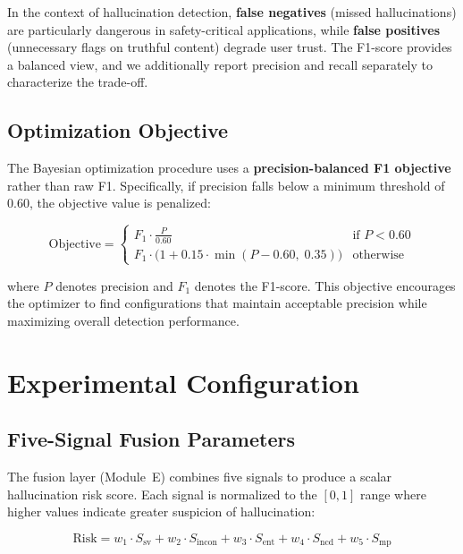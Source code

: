 In the context of hallucination detection, \textbf{false negatives} (missed hallucinations) are particularly dangerous in safety-critical applications, while \textbf{false positives} (unnecessary flags on truthful content) degrade user trust. The F1-score provides a balanced view, and we additionally report precision and recall separately to characterize the trade-off.

\subsection{Optimization Objective}
\label{sec:opt-objective}

The Bayesian optimization procedure uses a \textbf{precision-balanced F1 objective} rather than raw F1. Specifically, if precision falls below a minimum threshold of 0.60, the objective value is penalized:

\begin{equation}
    \text{Objective} =
    \begin{cases}
        F_1 \cdot \frac{P}{0.60}          & \text{if } P < 0.60 \\[6pt]
        F_1 \cdot \bigl(1 + 0.15 \cdot \min(P - 0.60,\; 0.35)\bigr) & \text{otherwise}
    \end{cases}
    \label{eq:objective}
\end{equation}

\noindent where $P$ denotes precision and $F_1$ denotes the F1-score. This objective encourages the optimizer to find configurations that maintain acceptable precision while maximizing overall detection performance.

\section{Experimental Configuration}
\label{sec:experimental-config}

\subsection{Five-Signal Fusion Parameters}

The fusion layer (Module~E) combines five signals to produce a scalar hallucination risk score. Each signal is normalized to the $[0, 1]$ range where higher values indicate greater suspicion of hallucination:

\begin{equation}
    \text{Risk} = w_1 \cdot S_{\text{sv}} + w_2 \cdot S_{\text{incon}} + w_3 \cdot S_{\text{ent}} + w_4 \cdot S_{\text{ncd}} + w_5 \cdot S_{\text{mp}}
    \label{eq:fusion-formula}
\end{equation}

